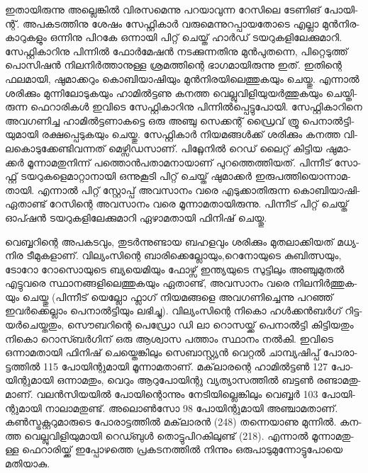 ഇ­താ­യി­രു­ന്നു അല്ലെ­ങ്കില്‍ വി­ര­സ­മെ­ന്നു പറ­യാ­വു­ന്ന റേ­സി­ലെ ടേ­ണി­ങ് പോ­യി­ന്റ്. അപ­ക­ട­ത്തി­നു ശേ­ഷം സേ­ഫ്റ്റി­കാര്‍ 
വരു­മെ­ന്നു­റ­പ്പാ­യ­തോ­ടെ എല്ലാ മുന്‍­നി­ര­കാ­റു­ക­ളും ഒന്നി­നു പി­റ­കേ ഒന്നാ­യി പി­റ്റ് ചെ­യ്ത് ഹാര്‍­ഡ് ടയ­റു­ക­ളി­ലേ­ക്കു­മാ­റി. സേ­ഫ്റ്റി­കാ­റി­നു 
പി­ന്നില്‍ ഫോര്‍­മേ­ഷന്‍ നട­ക്കു­ന്ന­തി­നു മുന്‍­പു­ത­ന്നെ, പി­റ്റെ­ടു­ത്ത് പൊ­സി­ഷന്‍ നി­ല­നിര്‍­ത്താ­നു­ള്ള ശ്ര­മ­ത്തി­ന്റെ ഭാ­ഗ­മാ­യി­രു­ന്നു ഇത്.
 ഇതി­ന്റെ ഫല­മാ­യി, ഷു­മാ­ക്ക­റും കൊ­ബി­യാ­ഷി­യും മുന്‍­നി­ര­യി­ലെ­ത്തു­ക­യും ചെ­യ്തു. എന്നാല്‍ ശരി­ക്കും മു­ന്നി­ലോ­ടു­ക­യും ഹാ­മില്‍­ട്ട­ണു 
 കന­ത്ത വെ­ല്ലു­വി­ളി­യു­യര്‍­ത്തു­ക­യും ചെ­യ്തി­രു­ന്ന ഫെ­റാ­രി­കള്‍ ഇവി­ടെ സേ­ഫ്റ്റി­കാ­റി­നു പി­ന്നില്‍­പ്പെ­ട്ടു­പോ­യി. സേ­ഫ്റ്റി­കാ­റി­നെ അവ­ഗ­ണി­ച്ച
  ഹാ­മില്‍­ട്ട­ണാ­ക­ട്ടെ ഒരു അഞ്ചു സെ­ക്ക­ന്റ് ഡ്രൈ­വ് ത്രൂ പെ­നാല്‍­ട്ടി­യു­മാ­യി രക്ഷ­പ്പെ­ടു­ക­യും ചെ­യ്തു. സേ­ഫ്റ്റി­കാര്‍ നി­യ­മ­ങ്ങള്‍­ക്ക് ശരി­ക്കും 
  കന­ത്ത വി­ല­കൊ­ടു­ക്കേ­ണ്ടി­വ­ന്ന­ത് മെ­ഴ്സി­ഡ­സാ­ണ്. പി­റ്റ്ലേ­നില്‍ റെ­ഡ് ലൈ­റ്റ് കി­ട്ടിയ ഷു­മാ­ക്കര്‍ മൂ­ന്നാ­മ­തു­നി­ന്ന് പത്തൊന്‍­പ­താ­മ­നാ­യാ­ണ് 
  പു­റ­ത്തെ­ത്തി­യ­ത്. പി­ന്നീ­ട് സോ­ഫ്റ്റ് ടയ­റു­ക­ളെ­മാ­റ്റാ­നാ­യി ഒന്നു­കൂ­ടി പി­റ്റ് ചെ­യ്ത് ഷു­മാ­ക്കര്‍ ഇരു­പ­ത്തി­യൊ­ന്നാ­മ­താ­യി. എന്നാല്‍ 
  പി­റ്റ് സ്റ്റോ­പ്പ് അവ­സാ­നം വരെ എടു­ക്കാ­തി­രു­ന്ന ­കൊ­ബി­യാ­ഷി­ ഏതാ­ണ്ട് റേ­സി­ന്റെ അവ­സാ­നം വരെ മൂ­ന്നാ­മ­താ­യി­രു­ന്നു. 
  പി­ന്നീ­ട് പി­റ്റ് ചെ­യ്ത് ഓപ്ഷന്‍ ടയ­റു­ക­ളി­ലേ­ക്കു­മാ­റി ഏഴാ­മ­താ­യി ഫി­നി­ഷ് ചെ­യ്തു­.

­വെ­ബ്ബ­റി­ന്റെ അപ­ക­ട­വും, തു­ടര്‍­ന്നു­ണ്ടായ ബഹ­ള­വും ശരി­ക്കും മു­ത­ലാ­ക്കി­യ­ത് മധ്യ­നിര ടീ­മു­ക­ളാ­ണ്. വി­ല്യം­സി­ന്റെ ബാ­രി­ക്കെ­ല്ലോ­യും­,­റെ­നോ­യു­ടെ 
കു­ബി­ത്സ­യും, ടോ­റോ റോ­സൊ­യു­ടെ ബ്യ­യെ­മി­യും ഫോ­ഴ്സ് ഇന്ത്യ­യു­ടെ സു­ട്ടി­ലും അഞ്ചു­മു­തല്‍ എട്ടു­വ­രെ സ്ഥാ­ന­ങ്ങ­ളി­ലെ­ത്തു­ക­യും ഏതാ­ണ്ട്,
 അവ­സാ­നം വരെ നി­ല­നിര്‍­ത്തു­ക­യും ചെ­യ്തു (പി­ന്നീ­ട് യെ­ല്ലോ ഫ്ലാ­ഗ് നി­യ­മ­ങ്ങ­ളെ അവ­ഗ­ണി­ച്ചെ­ന്നു പറ­ഞ്ഞ് ഇവര്‍­ക്കെ­ല്ലാം പെ­നാല്‍­ട്ടി­യും ലഭി­ച്ചു­).
  വി­ല്യം­സി­ന്റെ ­നി­കൊ ഹള്‍­ക്കന്‍­ബര്‍­ഗ് റി­ട്ട­യര്‍­ചെ­യ്ത­തും, സൌ­ബ­റി­ന്റെ പെ­ഡ്രോ ഡി ലാ റൊ­സ­യ്ക്ക് പെ­നാല്‍­ട്ടി കി­ട്ടി­യ­തും നി­കൊ 
  റൊ­സ്ബര്‍­ഗി­ന് ഒരു ആശ്വാസ പത്താം സ്ഥാ­നം നല്‍­കി. ഇവി­ടെ ഒന്നാ­മ­താ­യി ഫി­നി­ഷ് ചെ­യ്തെ­ങ്കി­ലും ­സെ­ബാ­സ്റ്റ്യന്‍ വെ­റ്റല്‍ 
  ചാ­മ്പ്യ­ഷി­പ്പ് പോ­രാ­ട്ട­ത്തില്‍ 115 പോ­യി­ന്റു­മാ­യി മൂ­ന്നാ­മ­താ­ണ്. മക്‌­ലാ­ര­ന്റെ ഹാ­മില്‍­ട്ടണ്‍ 127 പോ­യി­ന്റു­മാ­യി ഒന്നാ­മ­തും, വെ­റും 
  ആറു­പോ­യി­ന്റു വ്യ­ത്യാ­സ­ത്തില്‍ ബട്ടണ്‍ രണ്ടാ­മ­തു­മാ­ണ്. വലന്‍­സി­യ­യില്‍ പോ­യി­ന്റൊ­ന്നും നേ­ടി­യി­ല്ലെ­ങ്കി­ലും വെ­ബ്ബര്‍ 103 പോ­യി­ന്റു­മാ­യി 
  നാ­ലാ­മ­തു­ണ്ട്. അലൊണ്‍­സോ 98 പോ­യി­ന്റു­മാ­യി അഞ്ചാ­മ­താ­ണ്. കണ്‍­സ്ട്ര­ക്റ്റ­റു­മാ­രു­ടെ പോ­രാ­ട്ട­ത്തില്‍ മക്‌­ലാ­രന്‍ (248) തന്നെ­യാ­ണു
   മു­ന്നില്‍. കന­ത്ത വെ­ല്ലു­വി­ളി­യു­മാ­യി റെ­ഡ്ബുള്‍ തൊ­ട്ടു­പി­റ­കി­ലു­ണ്ട് (218). എന്നാല്‍ മൂ­ന്നാ­മ­തു­ള്ള ഫെ­റാ­രി­യ്ക്ക് ഇപ്പോ­ഴ­ത്തെ 
   പ്ര­ക­ട­ന­ത്തില്‍ നി­ന്നും ഒരു­പാ­ടു­മു­ന്നോ­ട്ടു­പോ­യെ മതി­യാ­കു­.

